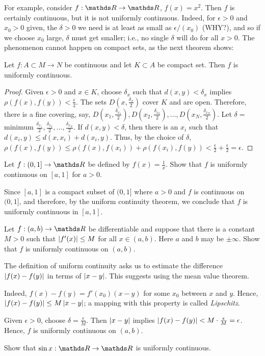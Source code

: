 \documentclass[../main-sheet.tex]{subfiles}
\begin{document}
For example, consider $ f:\R\to \R $, $ f(x)=x^2 $. Then $ f  $ is certainly continuous, but it is not uniformly continuous. Indeed, for $ \epsilon>0 $ and $ x_0>0 $ given, the $ \delta> 0 $ we need is at least as small as $ \epsilon/(x_0) $ (WHY?), and so if we choose $ x_0 $ large, $ \delta $ must get smaller; i.e., no single $ \delta $ will do for all $ x>0 $. The phenomenon cannot happen on compact sets, as the next theorem shows:
\begin{thm}
    Let $ f:A\subset M\to N $ be continuous and let $ K\subset A $ be compact set. Then $ f $ is uniformly continuous.
\end{thm}
\begin{proof}
    Given $ \epsilon>0 $ and $ x\in K $, choose $ \delta_x $ such that $ d(x,y)<\delta_x $ implies $ \rho(f(x),f(y))<\frac{\epsilon}{2} $. The sets $ D(x,\frac{\delta_x}{2}) $ cover $ K $ and are open. Therefore, there is a fine covering, say, $ D(x_1,\frac{\delta_{x_1}}{2}),D(x_2,\frac{\delta_{x_2}}{2}),\dots,D(x_N,\frac{\delta_{x_N}}{2}) $. Let $ \delta= $ minimum $ \frac{\delta_{x_1}}{2},\frac{\delta_{x_2}}{2},\dots,\frac{\delta_{x_N}}{2} $. If $ d(x,y)<\delta $, then there is an $ x_i $ such that $ d(x_i,y) \leq d(x,x_i)+d(x_i,y)$. Thus, by the choice of $ \delta $, $ \rho(f(x),f(y))\leq \rho(f(x),f(x_i))+\rho(f(x_i),f(y))<\frac{\epsilon}{2}+\frac{\epsilon}{2}=\epsilon $.
\end{proof}
\begin{prob}
    Let $ f:(0,1]\to\R $ be defined by $ f(x)=\frac{1}{x} $. Show that $ f $ is uniformly continuous on $ [a,1] $ for $ a>0 $.
\end{prob}
\begin{soln}
    Since $ [a,1] $ is a compact subset of $ (0,1] $ where $ a>0 $ and $ f $ is continuous on $ (0,1] $, and therefore, by the uniform continuity theorem, we conclude that $ f $ is uniformly continuous in $ [a,1] $.
\end{soln}
\begin{prob}
    Let $ f:(a,b)\to \R $ be differentiable and suppose that there is a constant $ M>0 $ such that $ \left\vert f'(x)\right\vert\leq M  $ for all $ x\in (a,b) $. Here $ a $ and $ b $ may be $ \pm \infty $. Show that $ f $ is uniformly continuous on $ (a,b) $.
\end{prob}
\begin{soln}
    The definition of uniform continuity asks us to estimate the difference $ \left\vert f(x)-f(y)\right\vert $ in terms of $ \left\vert x-y\right\vert $. This suggests using the mean value theorem.
    
    Indeed, $ f(x)-f(y)=f'(x_0)(x-y) $ for some $ x_0 $ between $ x $ and $ y $. Hence, $ \left\vert f(x)-f(y)\right\vert \leq M\left\vert x-y\right\vert $; a mapping with this property is called \emph{Lipschitz}.

    Given $ \epsilon>0 $, choose $ \delta=\frac{\epsilon}{M } $. Then $ \left\vert x-y\right\vert  $ implies $ \left\vert f(x)-f(y)\right\vert<M\cdot \frac{\epsilon}{M}=\epsilon $. Hence, $ f $ is uniformly continuous on $ (a,b) $.
\end{soln}
\begin{prob}
    Show that $ \sin x:\R \to\R $ is uniformly continuous.
\end{prob}
\end{document}
